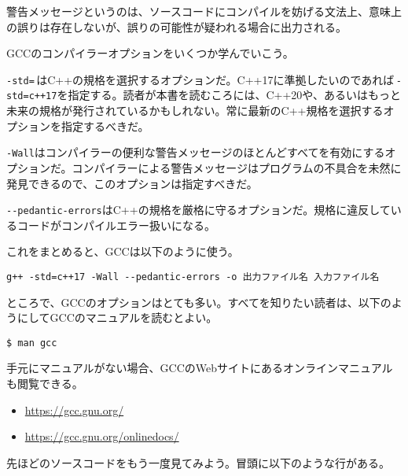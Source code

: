 警告メッセージというのは、ソースコードにコンパイルを妨げる文法上、意味上の誤りは存在しないが、誤りの可能性が疑われる場合に出力される。


GCCのコンパイラーオプションをいくつか学んでいこう。

\texttt{-std=}\,はC++の規格を選択するオプションだ。C++17に準拠したいのであれば\,\texttt{-std=c++17}を指定する。読者が本書を読むころには、C++20や、あるいはもっと未来の規格が発行されているかもしれない。常に最新のC++規格を選択するオプションを指定するべきだ。

\texttt{-Wall}はコンパイラーの便利な警告メッセージのほとんどすべてを有効にするオプションだ。コンパイラーによる警告メッセージはプログラムの不具合を未然に発見できるので、このオプションは指定すべきだ。

\texttt{{-}{-}pedantic-errors}はC++の規格を厳格に守るオプションだ。規格に違反しているコードがコンパイルエラー扱いになる。

これをまとめると、GCCは以下のように使う。

\begin{lstlisting}[style=grammar]
g++ -std=c++17 -Wall --pedantic-errors -o 出力ファイル名 入力ファイル名
\end{lstlisting}

ところで、GCCのオプションはとても多い。すべてを知りたい読者は、以下のようにしてGCCのマニュアルを読むとよい。

\begin{lstlisting}[style=terminal]
$ man gcc
\end{lstlisting}

手元にマニュアルがない場合、GCCのWebサイトにあるオンラインマニュアルも閲覧できる。

\begin{itemize}
\item
  \url{https://gcc.gnu.org/}
\item
  \url{https://gcc.gnu.org/onlinedocs/}
\end{itemize}


先ほどのソースコードをもう一度見てみよう。冒頭に以下のような行がある。

